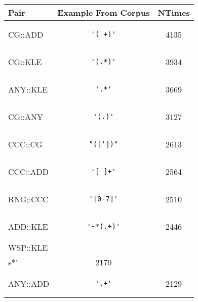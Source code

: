 \begin{center}
\begin{tabular}{lcc}
\toprule
\textbf{Pair} & \textbf{Example From Corpus} & \textbf{NTimes} \\
\midrule
CG::ADD & \begin{minipage}{2in}
\begin{verbatim}
'( +)'\end{verbatim}
\end{minipage}
& 4135 \\
\midrule
CG::KLE & \begin{minipage}{2in}
\begin{verbatim}
'(.*)'\end{verbatim}
\end{minipage}
& 3934 \\
\midrule
ANY::KLE & \begin{minipage}{2in}
\begin{verbatim}
'.*'\end{verbatim}
\end{minipage}
& 3669 \\
\midrule
CG::ANY & \begin{minipage}{2in}
\begin{verbatim}
'(.)'\end{verbatim}
\end{minipage}
& 3127 \\
\midrule
CCC::CG & \begin{minipage}{2in}
\begin{verbatim}
"(['])"\end{verbatim}
\end{minipage}
& 2613 \\
\midrule
CCC::ADD & \begin{minipage}{2in}
\begin{verbatim}
'[ ]+'\end{verbatim}
\end{minipage}
& 2564 \\
\midrule
RNG::CCC & \begin{minipage}{2in}
\begin{verbatim}
'[0-7]'\end{verbatim}
\end{minipage}
& 2510 \\
\midrule
ADD::KLE & \begin{minipage}{2in}
\begin{verbatim}
'-*(.+)'\end{verbatim}
\end{minipage}
& 2446 \\
\midrule
WSP::KLE & \begin{minipage}{2in}
\begin{verbatim}
'\\s*'\end{verbatim}
\end{minipage}
& 2170 \\
\midrule
ANY::ADD & \begin{minipage}{2in}
\begin{verbatim}
'.+'\end{verbatim}
\end{minipage}
& 2129 \\
\bottomrule
\end{tabular}
\end{center}
